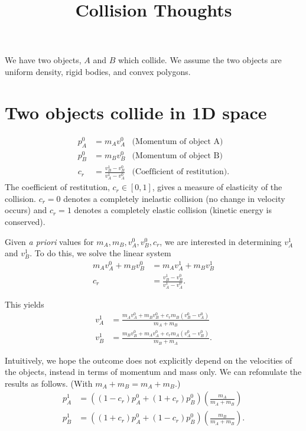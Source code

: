 \documentclass[a4paper,11pt, oneside]{article}
\title{Collision Thoughts}
\newcommand{\mtot}{m_A + m_B}
\begin{document}
\maketitle

We have two objects, $A$ and $B$ which collide.  We assume the two objects are uniform density, rigid bodies, and convex polygons.

\section{Two objects collide in 1D space}
\begin{align*}
    p_A^{0} &= m_Av_A^0 & \text{(Momentum of object A)}\\
    p_B^{0} &= m_Bv_B^0 & \text{(Momentum of object B)}\\
    c_r &= \frac{v_B^1 - v_B^0}{v_A^1 - v_A^0}  &\text{(Coefficient of restitution)}.
\end{align*}
The coefficient of restitution, $c_r\in[0,1]$, gives a measure of elasticity of the collision. $c_r = 0$ denotes a completely inelastic collision (no change in velocity occurs) and $c_r = 1$ denotes a completely elastic collision (kinetic energy is conserved).

Given \emph{a priori} values for $m_A, m_B, v_A^0, v_B^0, c_r$, we are interested in determining $v_A^1$ and $v_B^1$.  To do this, we solve the linear system
\begin{align*}
    m_Av_A^0 + m_Bv_B^0 &= m_Av_A^1 + m_Bv_B^1\\
    c_r &= \frac{v_B^1 - v_B^0}{v_A^1 - v_A^0}.
\end{align*}

This yields
\begin{align*}
    v_A^1 &= \frac{m_Av_A^0 + m_Bv_B^0 + c_r m_B (v_B^0 - v_A^0)}{m_A + m_B}\\
    v_B^1 &= \frac{m_Bv_B^0 + m_Av_A^0 + c_r m_A (v_A^0 - v_B^0)}{m_B + m_A}.
\end{align*}

Intuitively, we hope the outcome does not explicitly depend on the velocities of the objects, instead in terms of momentum and mass only.  We can refomulate the results as follows.  (With $\mtot = m_A + m_B$.)
\begin{align*}
    p_A^1 &= \left((1-c_r)p_A^0 + (1+c_r)p_B^0\right)\left(\frac{m_A}{\mtot}\right)\\
    p_B^1 &= \left((1+c_r)p_A^0 + (1-c_r)p_B^0\right)\left(\frac{m_B}{\mtot}\right).
\end{align*}
\end{document}
